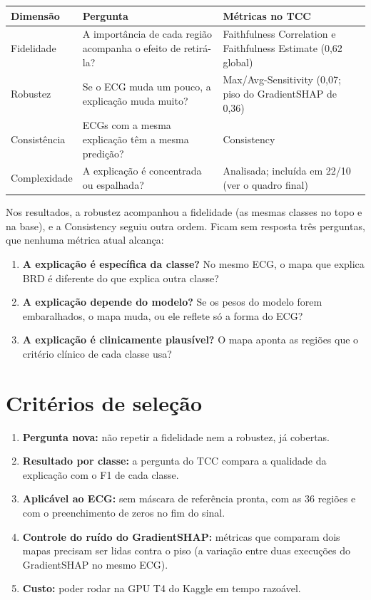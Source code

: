 \documentclass[11pt,a4paper]{article}
\begin{document}
\begin{center}\small
\begin{tabularx}{\linewidth}{lXX}
\toprule
\textbf{Dimensão} & \textbf{Pergunta} & \textbf{Métricas no TCC} \\
\midrule
Fidelidade & A importância de cada região acompanha o efeito de retirá-la? & Faithfulness Correlation e Faithfulness Estimate (0,62 global) \\
\addlinespace
Robustez & Se o ECG muda um pouco, a explicação muda muito? & Max/Avg-Sensitivity (0,07; piso do GradientSHAP de 0,36) \\
\addlinespace
Consistência & ECGs com a mesma explicação têm a mesma predição? & Consistency \\
\addlinespace
Complexidade & A explicação é concentrada ou espalhada? & Analisada; incluída em 22/10 (ver o quadro final) \\
\bottomrule
\end{tabularx}
\end{center}

Nos resultados, a robustez acompanhou a fidelidade (as mesmas classes no topo e na base), e a Consistency seguiu outra ordem. Ficam sem resposta três perguntas, que nenhuma métrica atual alcança:
\begin{enumerate}
\item \textbf{A explicação é específica da classe?} No mesmo ECG, o mapa que explica BRD é diferente do que explica outra classe?
\item \textbf{A explicação depende do modelo?} Se os pesos do modelo forem embaralhados, o mapa muda, ou ele reflete só a forma do ECG?
\item \textbf{A explicação é clinicamente plausível?} O mapa aponta as regiões que o critério clínico de cada classe usa?
\end{enumerate}

\section{Critérios de seleção}
\begin{enumerate}
\item \textbf{Pergunta nova:} não repetir a fidelidade nem a robustez, já cobertas.
\item \textbf{Resultado por classe:} a pergunta do TCC compara a qualidade da explicação com o F1 de cada classe.
\item \textbf{Aplicável ao ECG:} sem máscara de referência pronta, com as 36 regiões e com o preenchimento de zeros no fim do sinal.
\item \textbf{Controle do ruído do GradientSHAP:} métricas que comparam dois mapas precisam ser lidas contra o piso (a variação entre duas execuções do GradientSHAP no mesmo ECG).
\item \textbf{Custo:} poder rodar na GPU T4 do Kaggle em tempo razoável.
\end{enumerate}
\end{document}
